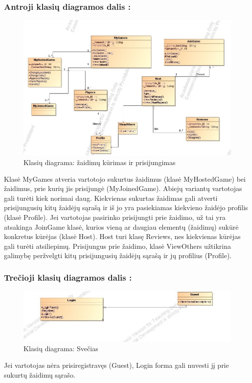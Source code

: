 \documentclass{VUMIFPSkursinis}
\begin{document}
		\subsubsection*{Antroji klasių diagramos dalis :}
			\begin{figure}[H]
				\centering
				\includegraphics[scale=0.5]{img/BoardGamesClassDiagrampt1}
				\caption{Klasių diagrama: žaidimų kūrimas ir prisijungimas}
				\label{img:BoardGamesClassDiagrampt1}
			\end{figure}
			Klasė MyGames atveria vartotojo sukurtus žaidimus (klasė MyHostedGame) bei žaidimus, prie kurių jis prisijungė (MyJoinedGame). Abiejų variantų vartotojas gali turėti kiek norimai daug. Kiekvienas sukurtas žaidimas gali atverti prisijungusių kitų žaidėjų sąrašą ir iš jo yra pasiekiamas kiekvieno žaidėjo profilis (klasė Profile). Jei vartotojas pasirinko prisijungti prie žaidimo, už tai yra atsakinga JoinGame klasė, kurios vieną ar daugiau elementų (žaidimų) sukūrė konkretus kūrėjas (klasė Host). Host turi klasę Reviews, nes kiekvienas kūrėjas gali turėti atsiliepimų. Prisijungus prie žaidimo, klasė ViewOthers užtikrina galimybę peržvelgti kitų prisijungusių žaidėjų sąrašą ir jų profilius (Profile).
		\subsubsection*{Trečioji klasių diagramos dalis :}
			\begin{figure}[H]
				\centering
				\includegraphics[scale=0.5]{img/BoardGamesClassDiagrampt2}
				\caption{Klasių diagrama: Svečias}
				\label{img:BoardGamesClassDiagrampt2}
			\end{figure}
			Jei vartotojas nėra prisiregistravęs (Guest), Login forma gali nuvesti jį prie sukurtų žaidimų sąrašo.
\end{document}
